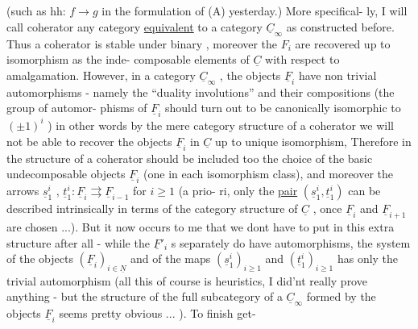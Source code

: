 
(such as hh: $f\to g$ in the formulation of (A) yesterday.) More specifical-%
ly, I will call coherator any category \uline{equivalent} to a category $\underline{C}_{\infty}$  as
constructed before.  Thus a coherator is stable under binary 
, moreover the $F_i$ are recovered up to isomorphism as the inde-%
composable elements of $\underline{C}$ with respect to amalgamation. However, in a
category $\underline{C}_{\infty}$ , the objects $\underline{F}_i$ have non trivial automorphisms - namely
\hand{(}the ``duality involutions'' and their compositions (the group of automor-%
phisms of $\underline{F}_i$ should turn out to be canonically isomorphic to $(\pm 1)^i$ ) in
 other words by the mere category structure of a coherator we
will not be able to recover the objects $\underline{F}_i$ in $\underline{C}$ up to unique isomorphism,
Therefore in the structure of a coherator should be included too the
choice of the basic undecomposable objects $\underline{F}_i$ (one in each isomorphism
class), and moreover the arrows $\underline{s}^i_1$ , $\underline{t}^i_1 : \underline{F}_i \rightrightarrows \underline{F}_{i-1}$ for $i\geq 1$ (a prio-%
ri, only the \uline{pair} $(\underline{s}^i_1 , \underline{t}^i_1)$ can be described intrinsically in terms
of the category structure of $\underline{C}$ , once $\underline{F}_i$ and $\underline{F}_{i+1}$ are chosen ...). But
it now occurs to me that we dont have to put in this extra structure after
all - while the $\underline{F}'_i$ s separately do have automorphisms, the system
of the objects $(\underline{F}_i)_{i\in\underline{N}}$ and of the maps $(\underline{s}^i_1)_{i\geq 1}$ and $(\underline{t}^i_1)_{i\geq 1}$ has only
the trivial automorphism (all this of course is heuristics, I did'nt
really prove anything - but the structure of the full subcategory of a
$\underline{C}_{\infty}$ formed by the objects $\underline{F}_i$ seems pretty obvious ... ). To finish get-%
